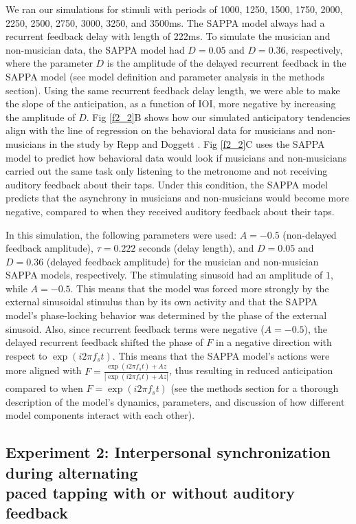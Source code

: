 \documentclass{report}
\begin{document}
We ran our simulations for stimuli with periods of 1000, 1250, 1500, 1750, 2000, 2250, 2500, 2750, 3000, 3250, and 3500ms. The SAPPA model always had a recurrent feedback delay with length of 222ms. To simulate the musician and non-musician data, the SAPPA model had $D = 0.05$ and $D = 0.36$, respectively, where the parameter $D$ is the amplitude of the delayed recurrent feedback in the SAPPA model (see model definition and parameter analysis in the methods section). Using the same recurrent feedback delay length, we were able to make the slope of the anticipation, as a function of IOI, more negative by increasing the amplitude of $D$. Fig \ref{f2_2}B shows how our simulated anticipatory tendencies align with the line of regression on the behavioral data for musicians and non-musicians in the study by Repp and Doggett \cite{repp2007tapping}. Fig \ref{f2_2}C uses the SAPPA model to predict how behavioral data would look if musicians and non-musicians carried out the same task only listening to the metronome and not receiving auditory feedback about their taps. Under this condition, the SAPPA model predicts that the asynchrony in musicians and non-musicians would become more negative, compared to when they received auditory feedback about their taps.

In this simulation, the following parameters were used: $A = -0.5$ (non-delayed feedback amplitude), $\tau = 0.222$ seconds (delay length), and $D = 0.05$ and $D = 0.36$ (delayed feedback amplitude) for the musician and non-musician SAPPA models, respectively. The stimulating sinusoid had an amplitude of $1$, while $A = -0.5$. This means that the model was forced more strongly by the external sinusoidal stimulus than by its own activity and that the SAPPA model’s phase-locking behavior was determined by the phase of the external sinusoid. Also, since recurrent feedback terms were negative ($A = -0.5$), the delayed recurrent feedback shifted the phase of $F$ in a negative direction with respect to $\exp(i2\pi f_s t)$. This means that the SAPPA model’s actions were more aligned with $F = \frac{\exp(i2\pi f_s t)+Az}{|\exp(i2\pi f_s t)+Az|}$, thus resulting in reduced anticipation compared to when $F = \exp(i2\pi f_s t)$ (see the methods section for a thorough description of the model’s dynamics, parameters, and discussion of how different model components interact with each other).

\subsection{Experiment 2: Interpersonal synchronization during alternating \\ paced tapping with or without auditory feedback}
\end{document}
